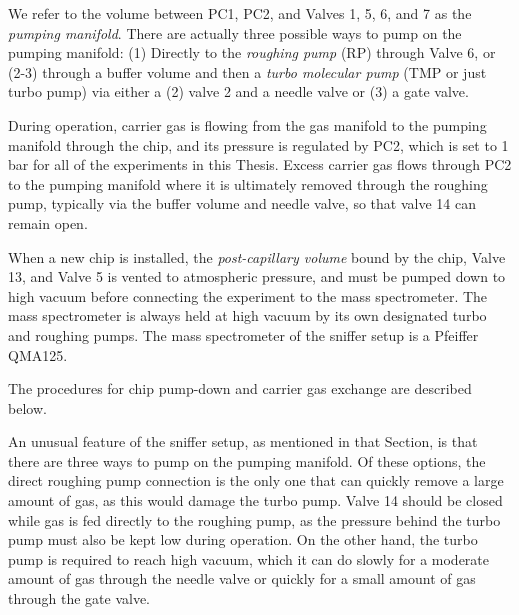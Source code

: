 We refer to the volume between PC1, PC2, and Valves 1, 5, 6, and 7 as the \textit{pumping manifold}. There are actually three possible ways to pump on the pumping manifold: (1) Directly to the \textit{roughing pump} (RP) through Valve 6, or (2-3) through a buffer volume and then a \textit{turbo molecular pump} (TMP or just turbo pump) via either a (2) valve 2 and a needle valve or (3) a gate valve. 

During operation, carrier gas is flowing from the gas manifold to the pumping manifold through the chip, and its pressure is regulated by PC2, which is set to 1 bar for all of the experiments in this Thesis. Excess carrier gas flows through PC2 to the pumping manifold where it is ultimately removed through the roughing pump, typically via the buffer volume and needle valve, so that valve 14 can remain open.

When a new chip is installed, the \textit{post-capillary volume} bound by the chip, Valve 13, and Valve 5 is vented to atmospheric pressure, and must be pumped down to high vacuum before connecting the experiment to the mass spectrometer. The mass spectrometer is always held at high vacuum by its own designated turbo and roughing pumps. The mass spectrometer of the sniffer setup is a Pfeiffer QMA125.

The procedures for chip pump-down and carrier gas exchange are described below.

An unusual feature of the sniffer setup, as mentioned in that Section, is that there are three ways to pump on the pumping manifold. Of these options, the direct roughing pump connection is the only one that can quickly remove a large amount of gas, as this would damage the turbo pump. Valve 14 should be closed while gas is fed directly to the roughing pump, as the pressure behind the turbo pump must also be kept low during operation. On the other hand, the turbo pump is required to reach high vacuum, which it can do slowly for a moderate amount of gas through the needle valve or quickly for a small amount of gas through the gate valve.

